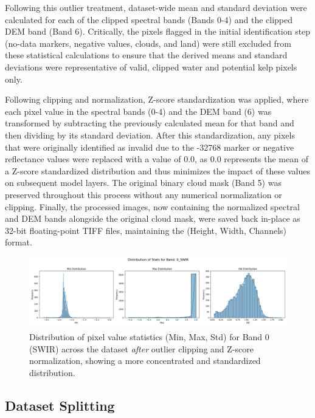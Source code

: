 \documentclass{article}
\begin{document}
Following this outlier treatment, dataset-wide mean and standard deviation were calculated for each of the clipped spectral bands (Bands 0-4) and the clipped DEM band (Band 6). Critically, the pixels flagged in the initial identification step (no-data markers, negative values, clouds, and land) were still excluded from these statistical calculations to ensure that the derived means and standard deviations were representative of valid, clipped water and potential kelp pixels only.

Following clipping and normalization, Z-score standardization was applied, where each pixel value in the spectral bands (0-4) and the DEM band (6) was transformed by subtracting the previously calculated mean for that band and then dividing by its standard deviation. After this standardization, any pixels that were originally identified as invalid due to the -32768 marker or negative reflectance values were replaced with a value of 0.0, as 0.0 represents the mean of a Z-score standardized distribution and thus minimizes the impact of these values on subsequent model layers. The original binary cloud mask (Band 5) was preserved throughout this process without any numerical normalization or clipping. Finally, the processed images, now containing the normalized spectral and DEM bands alongside the original cloud mask, were saved back in-place as 32-bit floating-point TIFF files, maintaining the (Height, Width, Channels) format. 

\begin{figure}[htbp]
    \centering
    \includegraphics[width=\textwidth]{distribution_0_SWIR_after.png} %
    \caption{Distribution of pixel value statistics (Min, Max, Std) for Band 0 (SWIR) across the dataset \textit{after} outlier clipping and Z-score normalization, showing a more concentrated and standardized distribution.}
    \label{fig:stats_after}
\end{figure}

\subsection{Dataset Splitting}
\end{document}
